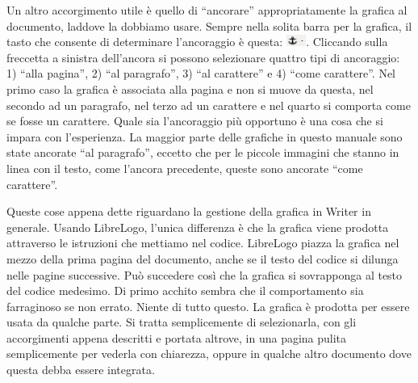 Un altro accorgimento utile è quello di “ancorare” appropriatamente la grafica al documento, laddove la dobbiamo usare. Sempre nella solita barra per la grafica, il tasto che consente di determinare l'ancoraggio è questa: \includegraphics[height=1em]{./images/librelogo/AncoraLO.png}. Cliccando sulla freccetta a sinistra dell'ancora si possono selezionare quattro tipi di ancoraggio: 1) “alla pagina”, 2) “al paragrafo”, 3) “al carattere” e 4) “come carattere”. Nel primo caso la grafica è associata alla pagina e non si muove da questa, nel secondo ad un paragrafo, nel terzo ad un carattere e nel quarto si comporta come se fosse un carattere. Quale sia l'ancoraggio più opportuno è una cosa che si impara con l'esperienza. La maggior parte delle grafiche in questo manuale sono state ancorate “al paragrafo”, eccetto che per le piccole immagini che stanno in linea con il testo, come l'ancora precedente, queste sono ancorate “come carattere”. 

Queste cose appena dette riguardano la gestione della grafica in Writer in generale. Usando LibreLogo, l'unica differenza è che la grafica viene prodotta attraverso le istruzioni che mettiamo nel codice. LibreLogo piazza la grafica nel mezzo della prima pagina del documento, anche se il testo del codice si dilunga nelle pagine successive. Può succedere così che la grafica si sovrapponga al testo del codice medesimo. Di primo acchito sembra che il comportamento sia farraginoso se non errato. Niente di tutto questo. La grafica è prodotta per essere usata da qualche parte. Si tratta semplicemente di selezionarla, con gli accorgimenti appena descritti e portata altrove, in una pagina pulita semplicemente per vederla con chiarezza, oppure in qualche altro documento dove questa debba essere integrata.



















